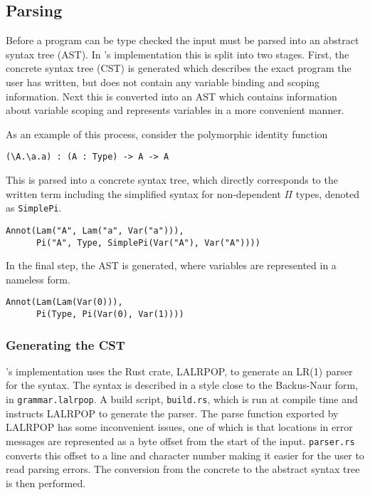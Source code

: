 \documentclass[12pt,a4paper,twoside]{report}
\begin{document}
\subsection{Parsing}

Before a program can be type checked the input must be parsed into an abstract syntax tree (AST).
In \pimu{}'s implementation this is split into two stages.
First, the concrete syntax tree (CST) is generated which describes the exact program the user has written, but does not contain any variable binding and scoping information.
Next this is converted into an AST which contains information about variable scoping and represents variables in a more convenient manner.

As an example of this process, consider the polymorphic identity function
\begin{lstlisting}
(\A.\a.a) : (A : Type) -> A -> A
\end{lstlisting}
This is parsed into a concrete syntax tree, which directly corresponds to the written term including the simplified syntax for non-dependent \(\Pi\) types, denoted as \lstinline{SimplePi}.
\begin{lstlisting}
Annot(Lam("A", Lam("a", Var("a"))),
      Pi("A", Type, SimplePi(Var("A"), Var("A"))))
\end{lstlisting}
In the final step, the AST is generated, where variables are represented in a nameless form.
\begin{lstlisting}
Annot(Lam(Lam(Var(0))),
      Pi(Type, Pi(Var(0), Var(1))))
\end{lstlisting}

\subsubsection{Generating the CST}

\pimu{}'s implementation uses the Rust crate, LALRPOP, to generate an LR(1) parser for the syntax.
The syntax is described in a style close to the Backus-Naur form, in \texttt{grammar.lalrpop}.
A build script, \texttt{build.rs}, which is run at compile time and instructs LALRPOP to generate the parser.
The parse function exported by LALRPOP has some inconvenient issues, one of which is that locations in error messages are represented as a byte offset from the start of the input.
\texttt{parser.rs} converts this offset to a line and character number making it easier for the user to read parsing errors.
The conversion from the concrete to the abstract syntax tree is then performed.
\end{document}

